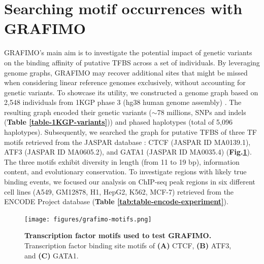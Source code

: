 \documentclass[a4paper, titlepage, openright]{book}
\newcommand{\grafimo}{GRAFIMO\xspace}
\begin{document}
\section{Searching motif occurrences with \grafimo}
\grafimo's main aim is to investigate the potential impact of genetic variants on the binding affinity of putative TFBS across a set of individuals. By leveraging genome graphs, \grafimo may recover additional sites that might be missed when considering linear reference genomes exclusively, without accounting for genetic variants. To showcase its utility, we constructed a genome graph based on 2,548 individuals from 1KGP phase 3 (hg38 human genome assembly) \citep{zheng2017alignment, lowy2019variant}. The resulting graph encoded their genetic variants ($\sim$78 millions, SNPs and indels (\textbf{Table \ref{table-1KGP-variants}})) and phased haplotypes (total of 5,096 haplotypes). Subsequently, we searched the graph for putative TFBS of three TF motifs retrieved from the JASPAR database \citep{sandelin2004jaspar, fornes2020jaspar}: CTCF (JASPAR ID MA0139.1), ATF3 (JASPAR ID MA0605.2), and GATA1 (JASPAR ID MA0035.4) (\textbf{Fig.\ref{fig:grafimo-motifs}}). The three motifs exhibit diversity in length (from 11 to 19 bp), information content, and evolutionary conservation. To investigate regions with likely true binding events, we focused our analysis on ChIP-seq peak regions in six different cell lines (A549, GM12878, H1, HepG2, K562, MCF-7) retrieved from the ENCODE Project database \citep{encode2012integrated, davis2018encyclopedia} (\textbf{Table \ref{tab:table-encode-experiment}}). 
%
\begin{figure}[!]
    \centering
    \texttt{[image: figures/grafimo-motifs.png]}
    \caption[Transcription factor motifs used to test \grafimo]{\textbf{Transcription factor motifs used to test \grafimo.} Transcription factor binding site motifs of \textbf{(A)} CTCF, \textbf{(B)} ATF3, and \textbf{(C)} GATA1.}
    \label{fig:grafimo-motifs}
\end{figure}
%
\end{document}
